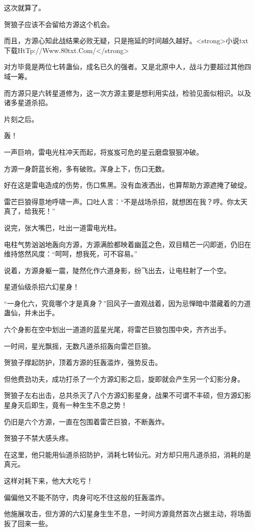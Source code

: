 \begin{this_body}
这次就算了。

贺狼子应该不会留给方源这个机会。

而且，方源心知此战结果必败无疑，只是拖延的时间越久越好。<strong>小说txt下载HtTp://Www.80txt.Com/</strong>

对方毕竟是两位七转蛊仙，成名已久的强者。又是北原中人，战斗力要超过其他四域一筹。

而方源只是六转星道修为，这一次方源主要是想利用实战，检验见面似相识。以及诸多星道杀招。

片刻之后。

轰！

一声巨响，雷电光柱冲天而起，将岌岌可危的星云磨盘狠狠冲破。

方源一身蔚蓝长袍，多有破败。浑身上下，伤口无数。

好在这是雷电造成的伤势，伤口焦黑。没有血液洒出，也算帮助方源遮掩了破绽。

雷芒巨狼得意地呼啸一声。口吐人言：“不是战场杀招，就想困在我？哼。你太天真了，给我死！”

说完，张大嘴巴，吐出一道雷电光柱。

电柱气势汹汹地轰向方源，方源满脸都映着幽蓝之色，双目精芒一闪即逝，仍旧在维持悠然风度：“呵呵，想我死，可不容易。”

说着，方源身躯一震，陡然化作六道身影，纷飞出去，让电柱射了一个空。

星道仙级杀招六幻星身！

“一身化六，究竟哪个才是真身？”回风子一直观战着，因为忌惮暗中潜藏着的力道蛊仙，并未出手。

六个身影在空中划出一道道的蓝星光尾，将雷芒巨狼包围中央，齐齐出手。

一时间，星光飘摇，无数凡道杀招轰向雷芒巨狼。

贺狼子撑起防护，顶着方源的狂轰滥炸，强势反击。

但他费劲功夫，成功打杀了一个方源幻影之后，旋即就会产生另一个幻影分身。

贺狼子左右出击，总共杀灭了八个方源幻影星身，战果不可谓不丰硕，但方源幻影星身灭后即生，竟有一种生生不息之势！

仍旧是六个方源，一直在包围着雷芒巨狼，不断轰炸。

贺狼子不禁大感头疼。

在这里，他只能用仙道杀招防护，消耗七转仙元。对方却只用凡道杀招，消耗的是真元。

这样对耗下来，他大大吃亏！

偏偏他又不能不防守，肉身可吃不住这般的狂轰滥炸。

他施展攻击，但方源的六幻星身生生不息，一时间方源竟然首次占据主动，将场面扳了回来一些。


\end{this_body}
